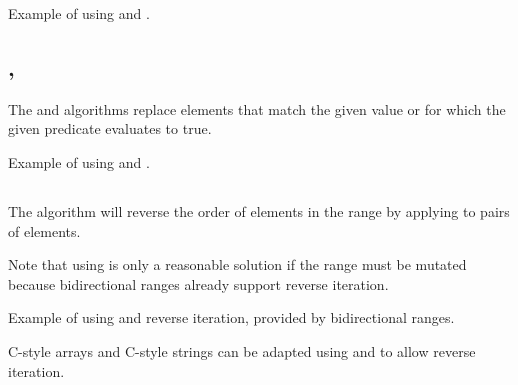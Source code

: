 \begin{box-note}
\footnotesize Example of using  and .
\tcblower
{}
\end{box-note}

\subsection{\texorpdfstring{, }{\texttt{std::remove}, \texttt{std::remove\_if}}}

The  and  algorithms replace elements that match the given value or for which the given predicate evaluates to true.


\begin{box-note}
\footnotesize Example of using  and .
\tcblower
{}
\end{box-note}

\subsection{\texorpdfstring{}{\texttt{std::reverse}}}

The  algorithm will reverse the order of elements in the range by applying  to pairs of elements.


Note that using  is only a reasonable solution if the range must be mutated because bidirectional ranges already support reverse iteration.

\begin{box-note}
\footnotesize Example of using  and reverse iteration, provided by bidirectional ranges.
\tcblower
{}
\end{box-note}

C-style arrays and C-style strings can be adapted using  and  to allow reverse iteration.

